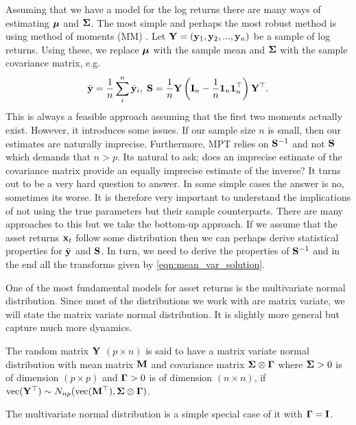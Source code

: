 \documentclass[oneside]{book}\usepackage{knitr}
\begin{document}
Assuming that we have a model for the log returns there are many ways of estimating $\mbox{\boldmath$\mu$}$ and $\mathbf{\Sigma}$.
The most simple and perhaps the most robust method is using method of moments (MM) \cite{REF}. 
Let $\mathbf{Y} = (\mathbf{y}_1, \mathbf{y}_2, ..., \mathbf{y}_n)$ be a sample of log returns.
Using these, we replace $\mbox{\boldmath$\mu$}$ with the sample mean and $\mathbf{\Sigma}$ with the sample covariance matrix, e.g.
$$
\bar{\mathbf{y}} = \frac{1}{n} \sum_i^n \bar{\mathbf{y}}_i, \; \mathbf{S} = \frac{1}{n}\mathbf{Y} \left(\mathbf{I}_n - \frac{1}{n} \mathbf{1}_n \mathbf{1}_n^\top \right) \mathbf{Y}^\top.
$$
This is always a feasible approach assuming that the first two moments actually exist. 
However, it introduces some issues.
If our sample size $n$ is small, then our estimates are naturally imprecise. 
Furthermore, MPT relies on $\mathbf{S}^{-1}$ and not $\mathbf{S}$ which demands that $n>p$. 
Its natural to ask; does an imprecise estimate of the covariance matrix provide an equally imprecise estimate of the inverse?
It turns out to be a very hard question to answer. In some simple cases the answer is no, sometimes its worse. 
It is therefore very important to understand the implications of not using the true parameters but their sample counterparts.
There are many approaches to this but we take the bottom-up approach. 
If we assume that the asset returns $\mathbf{x}_t$ follow some distribution then we can perhaps derive statistical properties for $\bar{\mathbf{y}}$ and $\mathbf{S}$.
In turn, we need to derive the properties of $\mathbf{S}^{-1}$ and in the end all the transforms given by \eqref{eqn:mean_var_solution}.

One of the most fundamental models for asset returns is the multivariate normal distribution. 
Since most of the distributions we work with are matrix variate, we will state the matrix variate normal distribution. 
It is slightly more general but capture much more dynamics.
\begin{definition}
	The random matrix $\mathbf{Y}$ $(p \times n)$ is said to have a matrix variate normal distribution with mean matrix $\mathbf{M}$ and covariance matrix $\mathbf{\Sigma} \otimes \boldsymbol{\Gamma}$ where $\mathbf{\Sigma} > 0$ is of dimension $(p \times p)$ and $\boldsymbol{\Gamma} >0$ is of dimension $(n \times n)$, if $\operatorname{vec}(\mathbf{Y}^\top) \sim N_{np}(\operatorname{vec}(\mathbf{M}^\top), \mathbf{\Sigma} \otimes \boldsymbol{\Gamma})$.
\end{definition}
The multivariate normal distribution is a simple special case of it with $\boldsymbol{\Gamma} = \mathbf{I}$. 
\end{document}
